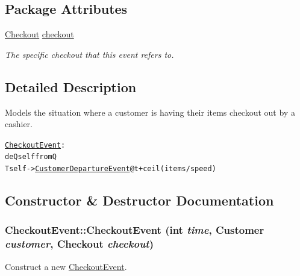 \subsection*{Package Attributes}
\begin{CompactItemize}
\item 
\hypertarget{class_checkout_event_dfce79e87746f130c500be6ccdf1ad47}{
\hyperlink{class_checkout}{Checkout} \hyperlink{class_checkout_event_dfce79e87746f130c500be6ccdf1ad47}{checkout}}
\label{class_checkout_event_dfce79e87746f130c500be6ccdf1ad47}

\begin{CompactList}\small\item\em The specific checkout that this event refers to. \item\end{CompactList}\end{CompactItemize}


\subsection{Detailed Description}
Models the situation where a customer is having their items checkout out by a cashier. 

\small\begin{alltt}
 \hyperlink{class_checkout_event}{CheckoutEvent}:
  deQ self from Q
  T self -> \hyperlink{class_customer_departure_event}{CustomerDepartureEvent} @ t+ceil(items/speed)
 \end{alltt}
\normalsize 
 

\subsection{Constructor \& Destructor Documentation}
\hypertarget{class_checkout_event_186ebd3d8ea22f2779526c6633a64b97}{
\subsubsection[{CheckoutEvent}]{\setlength{\rightskip}{0pt plus 5cm}CheckoutEvent::CheckoutEvent (int {\em time}, \/  {\bf Customer} {\em customer}, \/  {\bf Checkout} {\em checkout})}}
\label{class_checkout_event_186ebd3d8ea22f2779526c6633a64b97}


Construct a new \hyperlink{class_checkout_event}{CheckoutEvent}. 

